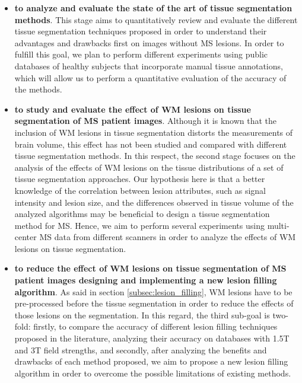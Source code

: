 \begin{itemize}

\item \textbf{to analyze and evaluate the state of the art of tissue segmentation methods}. This stage aims to quantitatively review and evaluate the different tissue segmentation techniques proposed in order to understand their advantages and drawbacks first on images without MS lesions. In order to fulfill this goal, we plan to perform different experiments using public databases of healthy subjects that incorporate manual tissue annotations, which will allow us to perform a quantitative evaluation of the accuracy of the methods. 
  
\item \textbf{to study and evaluate the effect of WM lesions on tissue segmentation of MS patient images}. Although it is known that the inclusion of WM lesions in tissue segmentation distorts the measurements of brain volume, this effect has not been studied and compared with different tissue segmentation methods. In this respect, the second stage focuses on the analysis of the effects of WM lesions on the tissue distributions of a set of tissue segmentation approaches. Our hypothesis here is that a better knowledge of the correlation between lesion attributes, such as signal intensity and lesion size, and the differences observed in tissue volume of the analyzed algorithms may be beneficial to design a tissue segmentation method for MS. Hence, we aim to perform several experiments using multi-center MS data from different scanners in order to analyze the effects of WM lesions on tissue segmentation.

\item \textbf{to reduce the effect of WM lesions on tissue segmentation of MS patient images designing and implementing a new lesion filling algorithm}. As said in section \ref{subsec:lesion_filling}, WM lesions have to be pre-processed before the tissue segmentation in order to reduce the effects of those lesions on the segmentation. In this regard, the third sub-goal is two-fold: firstly, to compare the accuracy of different lesion filling techniques proposed in the literature, analyzing their accuracy on databases with 1.5T and 3T field strengths, and secondly, after analyzing the benefits and drawbacks of each method proposed, we aim to propose a new lesion filling algorithm in order to overcome the possible limitations of existing methods.


\end{itemize}
